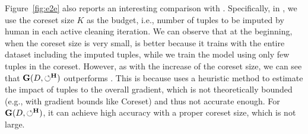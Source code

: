 Figure~\ref{fig:e2e} also reports an interesting comparison with \actclean. Specifically, 
in \actclean, we use the coreset size $K$ as the budget, i.e., number of tuples to be imputed by human in each active cleaning iteration.  
We can observe that at the beginning, when the coreset size is very small, \actclean is better because it trains with the entire dataset including the imputed tuples, while we train the model using only  few tuples in the coreset.
However, as with the increase of the coreset size, we can see that $\mathbf{G}(D,\circlearrowleft^\mathbf{H})$ outperforms \actclean. This is because \actclean uses a heuristic method to estimate the impact of tuples to the overall gradient, which is not theoretically bounded (e.g., with gradient bounds like Coreset) and thus not accurate enough.
For $\mathbf{G}(D,\circlearrowleft^\mathbf{H})$, it can achieve high accuracy with a proper coreset size, which is not large.











 